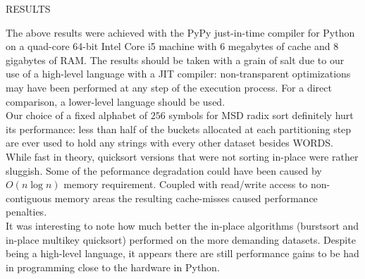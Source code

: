  {\sffamily\normalsize{\color{sciorange}RESULTS}}\vspace{-7mm}\small\\
 \footnotesize 
\begin{multicols}{3}
The above results were achieved with the PyPy just-in-time compiler for
Python on a quad-core 64-bit Intel Core i5 machine with 6 megabytes of
cache and 8 gigabytes of RAM.  The results should be taken with a grain
of salt due to our use of a high-level language with a JIT compiler:
non-transparent optimizations may have been performed at any step of the
execution process.  For a direct comparison, a lower-level language should
be used.\\

Our choice of a fixed alphabet of $256$ symbols for MSD radix sort definitely
hurt its performance: less than half of the buckets allocated at each
partitioning step are ever used to hold any strings with every other dataset
besides WORDS.\\

While fast in theory, quicksort versions that were not sorting in-place were
rather sluggish.  Some of the peformance degradation could have been caused
by $O(n \log n)$  memory requirement.  Coupled with read/write access to
non-contiguous memory areas the resulting cache-misses caused performance
penalties.\\

It was interesting to note how much better the in-place algorithms (burstsort
and in-place multikey quicksort) performed on the more demanding datasets.
Despite being a high-level language, it appears there are still performance
gains to be had in programming close to the hardware in Python.
\end{multicols}
